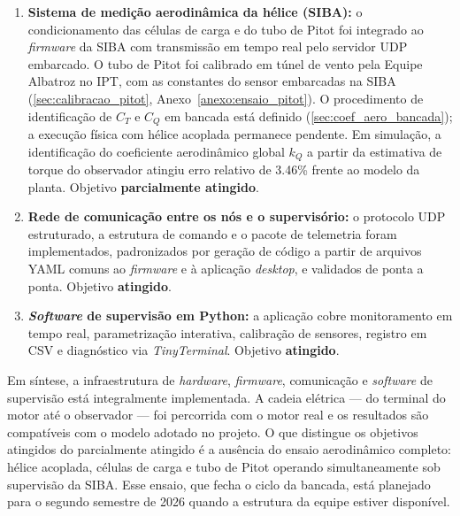 \begin{enumerate}
    \item \textbf{Sistema de medição aerodinâmica da hélice (SIBA):}
    o condicionamento das células de carga e do tubo de Pitot foi integrado ao
    \textit{firmware} da SIBA com transmissão em tempo real pelo servidor UDP
    embarcado. O tubo de Pitot foi calibrado em túnel de vento pela Equipe
    Albatroz no IPT, com as constantes do sensor embarcadas na SIBA
    (\autoref{sec:calibracao_pitot}, Anexo~\ref{anexo:ensaio_pitot}). O
    procedimento de identificação de $C_T$ e $C_Q$ em bancada está definido
    (\autoref{sec:coef_aero_bancada}); a execução física com hélice acoplada
    permanece pendente. Em simulação, a identificação do coeficiente
    aerodinâmico global $k_Q$ a partir da estimativa de torque do observador
    atingiu erro relativo de \num{3,46}\% frente ao modelo da planta.
    Objetivo \textbf{parcialmente atingido}.

    \item \textbf{Rede de comunicação entre os nós e o supervisório:}
    o protocolo UDP estruturado, a estrutura de comando e o pacote de
    telemetria foram implementados, padronizados por geração de código a
    partir de arquivos YAML comuns ao \textit{firmware} e à aplicação
    \textit{desktop}, e validados de ponta a ponta. Objetivo \textbf{atingido}.

    \item \textbf{\textit{Software} de supervisão em Python:}
    a aplicação cobre monitoramento em tempo real, parametrização interativa,
    calibração de sensores, registro em CSV e diagnóstico via
    \textit{TinyTerminal}. Objetivo \textbf{atingido}.

\end{enumerate}

Em síntese, a infraestrutura de \textit{hardware}, \textit{firmware},
comunicação e \textit{software} de supervisão está integralmente implementada.
A cadeia elétrica --- do terminal do motor até o observador --- foi percorrida
com o motor real e os resultados são compatíveis com o modelo adotado no
projeto. O que distingue os objetivos atingidos do parcialmente atingido é a
ausência do ensaio aerodinâmico completo: hélice acoplada, células de carga e
tubo de Pitot operando simultaneamente sob supervisão da SIBA. Esse ensaio,
que fecha o ciclo da bancada, está planejado para o segundo semestre de
\num{2026} quando a estrutura da equipe estiver disponível.
